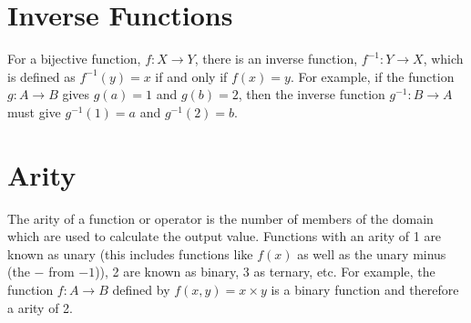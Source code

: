 \section*{Inverse Functions}

For a bijective function, $f : X \rightarrow Y$, there is an inverse function, $f^{-1} : Y \rightarrow X$, which is
 defined as $f^{-1}(y) = x$ if and only if $f(x) = y$. For example, if the function $g : A \rightarrow B$ gives
 $g(a) = 1$ and $g(b) = 2$, then the inverse function $g^{-1} : B \rightarrow A$ must give $g^{-1}(1) = a$ and
 $g^{-1}(2) = b$.

\section*{Arity}

The arity of a function or operator is the number of members of the domain which are used to calculate the output value.
 Functions with an arity of 1 are known as unary (this includes functions like $f(x)$ as well as the unary minus (the 
 $-$ from $-1$)), 2 are known as binary, 3 as ternary, etc. For example, the function $f : A \rightarrow B$ defined by
 $f(x, y) = x \times y$ is a binary function and therefore a arity of 2.